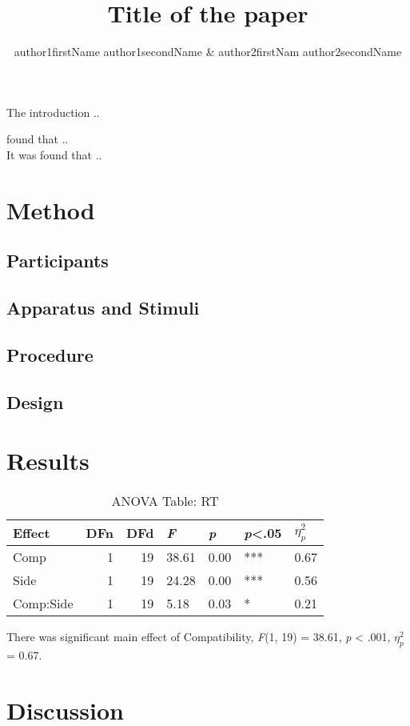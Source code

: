 \documentclass[man, 12pt]{apa6}
\title{Title of the paper}
\author{author1firstName author1secondName \& author2firstNam
author2secondName}
\affiliation{Department of Psychology, University of XXX}
\begin{document}

\maketitle
The introduction .. \textcite{botvinick2001conflict}

\textcite{botvinick2001conflict} found that .. \\
It was found that .. \parencite[][]{simon1969reactions, eriksen1974effects, stroop1935studies}

\section{Method}
\subsection{Participants}
\subsection{Apparatus and Stimuli}
\subsection{Procedure}

\subsection{Design}

\section{Results}


\begin{longtable}{lrrllll}
\caption{ANOVA Table: RT} \\ 
  \hline
Effect & DFn & DFd & \textit{F} & \textit{p} & \textit{p}<.05 & $\eta_{p}^2$ \\ 
  \hline
Comp &    1 &   19 & 38.61 & 0.00 & *** & 0.67 \\ 
  Side &    1 &   19 & 24.28 & 0.00 & *** & 0.56 \\ 
  Comp:Side &    1 &   19 &  5.18 & 0.03 & * & 0.21 \\ 
   \hline
\hline
\end{longtable}
There was significant main effect of Compatibility, \emph{F}(1, 19) = 38.61, \emph{p} < .001, $\eta_{p}^2$ = 0.67.

\section{Discussion}

\printbibliography
\end{document}
